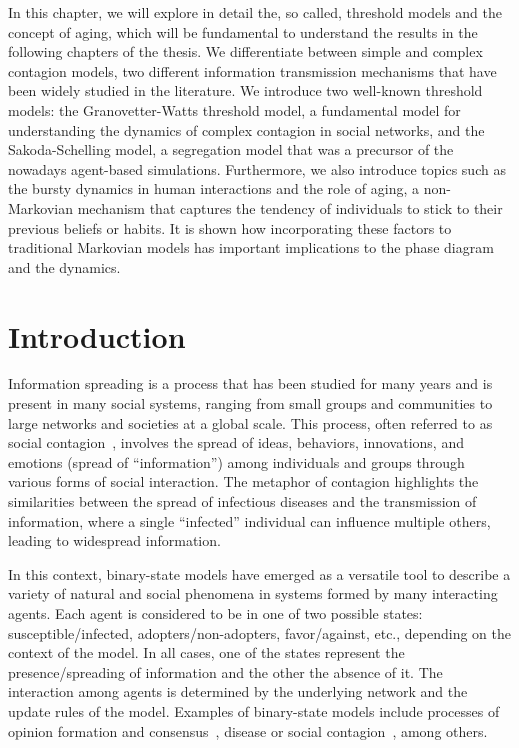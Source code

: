 In this chapter, we will explore in detail the, so called, threshold models and the concept of aging, which will be fundamental to understand the results in the following chapters of the thesis. We differentiate between simple and complex contagion models, two different information transmission mechanisms that have been widely studied in the literature. We introduce two well-known threshold models: the Granovetter-Watts threshold model, a fundamental model for understanding the dynamics of complex contagion in social networks, and the Sakoda-Schelling model, a segregation model that was a precursor of the nowadays agent-based simulations. Furthermore, we also introduce topics such as the bursty dynamics in human interactions and the role of aging, a non-Markovian mechanism that captures the tendency of individuals to stick to their previous beliefs or habits. It is shown how incorporating these factors to traditional Markovian models has important implications to the phase diagram and the dynamics. 

\section{\label{sec:Introduction} Introduction}

Information spreading is a process that has been studied for many years and is present in many social systems, ranging from small groups and communities to large networks and societies at a global scale. This process, often referred to as social contagion~\cite{christakis2013social}, involves the spread of ideas, behaviors, innovations, and emotions (spread of ``information'') among individuals and groups through various forms of social interaction. The metaphor of contagion highlights the similarities between the spread of infectious diseases and the transmission of information, where a single ``infected'' individual can influence multiple others, leading to widespread information.

In this context, binary-state models have emerged as a versatile tool to describe a variety of natural and social phenomena in systems formed by many interacting agents. Each agent is considered to be in one of two possible states: susceptible/infected, adopters/non-adopters, favor/against, etc., depending on the context of the model. In all cases, one of the states represent the presence/spreading of information and the other the absence of it. The interaction among agents is determined by the underlying network and the update rules of the model. Examples of binary-state models include processes of opinion formation and consensus~\cite{Voter-original,sood-2005,fernandez-gracia-2014,redner-2019}, disease or social contagion~\cite{granovetter-1978,pastor-satorras-2015}, among others. 

